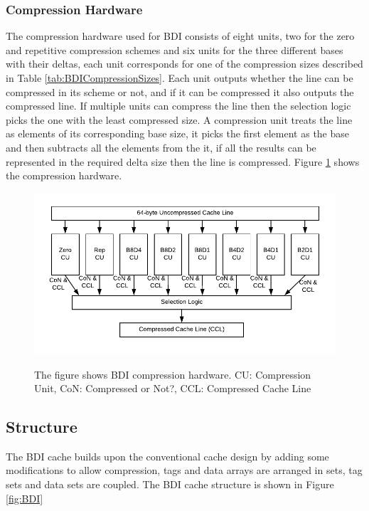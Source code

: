 \subsubsection{Compression Hardware}
\label{sssec:BDICompressionHardware}
The compression hardware used for BDI consists of eight units, two for the zero and repetitive compression schemes and six units for the three different bases with their deltas, each unit corresponds for one of the compression sizes described in Table \ref{tab:BDICompressionSizes}. Each unit outputs whether the line can be compressed in its scheme or not, and if it can be compressed it also outputs the compressed line. If multiple units can compress the line then the selection logic picks the one with the least compressed size.
A compression unit treats the line as elements of its corresponding base size, it picks the first element as the base and then subtracts all the elements from the it, if all the results can be represented in the required delta size then the line is compressed. Figure \ref{fig:BDIHardware} shows the compression hardware.
\begin{figure}
    \includegraphics[width=\textwidth]{BDIHardware.pdf}
    \label{fig:BDIHardware}
    \caption[BDI Compression Hardware]{The figure shows BDI compression hardware. CU: Compression Unit, CoN: Compressed or Not?, CCL: Compressed Cache Line}
\end{figure}

\subsection{Structure}
\label{ssec:BDIStructure}
The BDI cache builds upon the conventional cache design by adding some modifications to allow compression, tags and data arrays are arranged in sets, tag sets and data sets are coupled. The BDI cache structure is shown in Figure \ref{fig:BDI}
